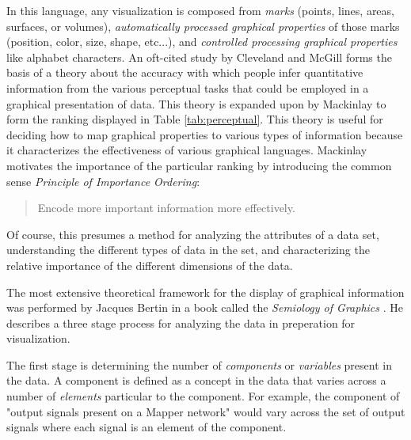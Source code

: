 In this language, any visualization is composed from \emph{marks} (points, lines, areas, surfaces, or volumes), \emph{automatically processed graphical properties} of those marks (position, color, size, shape, etc...), and \emph{controlled processing graphical properties} like alphabet characters. An oft-cited study by Cleveland and McGill \cite{cleveland1984} forms the basis of a theory about the accuracy with which people infer quantitative information from the various perceptual tasks that could be employed in a graphical presentation of data. This theory is expanded upon by Mackinlay \cite{jock1986} to form the ranking displayed in Table \ref{tab:perceptual}. This theory is useful for deciding how to map graphical properties to various types of information because it characterizes the effectiveness of various graphical languages. Mackinlay motivates the importance of the particular ranking by introducing the common sense \emph{Principle of Importance Ordering}:

\begin{quote}
Encode more important information more effectively. \cite{jock1986}
\end{quote}

\begin{comment}
The Structure of the Information Visualization Design Space, Section 2 
controlled vs. automatic processing
connection

Visual Information Seeking: Tight Coupling of Dynamic Query Filters with Starfield Displays
\end{comment}

Of course, this presumes a method for analyzing the attributes of a data set, understanding the different types of data in the set, and characterizing the relative importance of the different dimensions of the data.

The most extensive theoretical framework for the display of graphical information was performed by Jacques Bertin in a book called the \emph{Semiology of Graphics} \cite{semiology1983}. He describes a three stage process for analyzing the data in preperation for visualization.

The first stage is determining the number of \emph{components} or \emph{variables} present in the data. A component is defined as a concept in the data that varies across a number of \emph{elements} particular to the component. For example, the component of "output signals present on a Mapper network" would vary across the set of output signals where each signal is an element of the component. 

